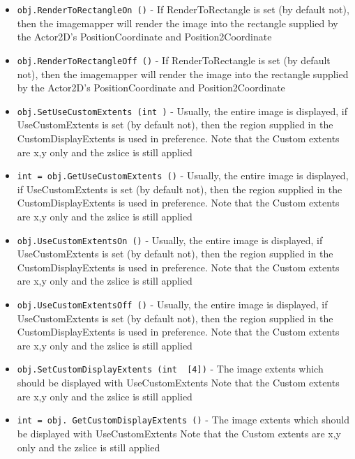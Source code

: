 \begin{itemize}
\item  \verb|obj.RenderToRectangleOn ()| -  If RenderToRectangle is set (by default not), then the imagemapper
 will render the image into the rectangle supplied by the Actor2D's
 PositionCoordinate and Position2Coordinate

\item  \verb|obj.RenderToRectangleOff ()| -  If RenderToRectangle is set (by default not), then the imagemapper
 will render the image into the rectangle supplied by the Actor2D's
 PositionCoordinate and Position2Coordinate

\item  \verb|obj.SetUseCustomExtents (int )| -  Usually, the entire image is displayed, if UseCustomExtents
 is set (by default not), then the region supplied in the
 CustomDisplayExtents is used in preference.
 Note that the Custom extents are x,y only and the zslice is still
 applied

\item  \verb|int = obj.GetUseCustomExtents ()| -  Usually, the entire image is displayed, if UseCustomExtents
 is set (by default not), then the region supplied in the
 CustomDisplayExtents is used in preference.
 Note that the Custom extents are x,y only and the zslice is still
 applied

\item  \verb|obj.UseCustomExtentsOn ()| -  Usually, the entire image is displayed, if UseCustomExtents
 is set (by default not), then the region supplied in the
 CustomDisplayExtents is used in preference.
 Note that the Custom extents are x,y only and the zslice is still
 applied

\item  \verb|obj.UseCustomExtentsOff ()| -  Usually, the entire image is displayed, if UseCustomExtents
 is set (by default not), then the region supplied in the
 CustomDisplayExtents is used in preference.
 Note that the Custom extents are x,y only and the zslice is still
 applied

\item  \verb|obj.SetCustomDisplayExtents (int  [4])| -  The image extents which should be displayed with UseCustomExtents
 Note that the Custom extents are x,y only and the zslice is still
 applied

\item  \verb|int = obj. GetCustomDisplayExtents ()| -  The image extents which should be displayed with UseCustomExtents
 Note that the Custom extents are x,y only and the zslice is still
 applied

\end{itemize}
